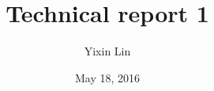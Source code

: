 \documentclass{article}
\begin{document}
\title{Technical report 1}
\author{Yixin Lin}
\date{May 18, 2016}
\maketitle







\newpage


\end{document}
